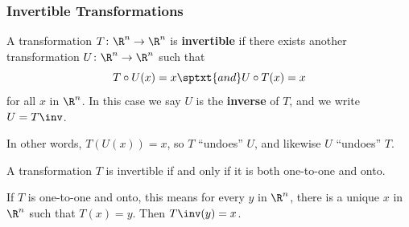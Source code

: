 


\usetikzlibrary{decorations.pathreplacing}



\begin{frame}
\frametitle{Invertible Transformations}

\vskip-3mm
\begin{defn}
  A transformation $T\colon\R^n\to\R^n$ is \textbf{invertible} if there exists
  another transformation $U\colon\R^n\to\R^n$ such that 
  \[ T\circ U(x) = x \sptxt{and} U\circ T(x) = x \]
  for all $x$ in $\R^n$.
  \pause
  In this case we say $U$ is the \textbf{inverse} of $T$, and we write 
  $U = T\inv$.
\end{defn}

\pause\smallskip
In other words, $T(U(x)) = x$, so $T$ ``undoes'' $U$, and likewise $U$
``undoes'' $T$.

\pause\smallskip
\begin{bluebox}[Fact]{.5\linewidth}
  A transformation $T$ is invertible if and only if it is both one-to-one and
  onto.
\end{bluebox}

\begin{webonly}
If $T$ is one-to-one and onto, this means
for every $y$ in $\R^n$, there is a unique $x$ in $\R^n$ such that $T(x) = y$.
Then $T\inv(y) = x$.
\end{webonly}

\end{frame}



